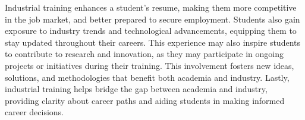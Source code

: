 Industrial training enhances a student’s resume, making them more competitive in the job market, and better prepared to secure employment. Students also gain exposure to industry trends and technological advancements, equipping them to stay updated throughout their careers. This experience may also inspire students to contribute to research and innovation, as they may participate in ongoing projects or initiatives during their training. This involvement fosters new ideas, solutions, and methodologies that benefit both academia and industry. Lastly, industrial training helps bridge the gap between academia and industry, providing clarity about career paths and aiding students in making informed career decisions.